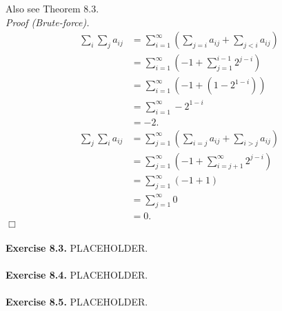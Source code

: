 \documentclass{article}
\begin{document}
Also see Theorem 8.3. \\

\emph{Proof (Brute-force).}
\begin{align*}
  \sum_{i} \sum_{j} a_{ij}
  &= \sum_{i=1}^{\infty} \left( \sum_{j = i} a_{ij} + \sum_{j < i} a_{ij} \right) \\
  &= \sum_{i=1}^{\infty} \left( -1 + \sum_{j=1}^{i-1} 2^{j-i} \right) \\
  &= \sum_{i=1}^{\infty} ( -1 + (1 - 2^{1-i}) ) \\
  &= \sum_{i=1}^{\infty} -2^{1-i} \\
  &= -2.
\end{align*}
\begin{align*}
  \sum_{j} \sum_{i} a_{ij}
  &= \sum_{j=1}^{\infty} \left( \sum_{i = j} a_{ij} + \sum_{i > j} a_{ij} \right) \\
  &= \sum_{j=1}^{\infty} \left( -1 + \sum_{i=j+1}^{\infty} 2^{j-i} \right) \\
  &= \sum_{j=1}^{\infty} ( -1 + 1 ) \\
  &= \sum_{j=1}^{\infty} 0 \\
  &= 0.
\end{align*}
$\Box$ \\\\






\textbf{Exercise 8.3.}
PLACEHOLDER. \\\\






\textbf{Exercise 8.4.}
PLACEHOLDER. \\\\






\textbf{Exercise 8.5.}
PLACEHOLDER. \\\\



\end{document}
